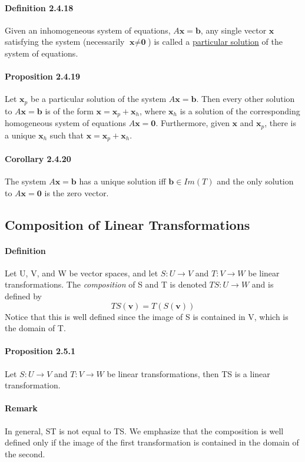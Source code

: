 \documentclass[11pt]{article}
\newcommand{\ti}[1]{\textit{#1}}
\newcommand{\tb}[1]{\textbf{#1}}
\newcommand{\under}[1]{\underline{#1}}
\begin{document}
{\paragraph{Definition 2.4.18} Given an inhomogeneous system of equations, $A\tb{x} = \tb{b}$, any single vector $\tb{x}$ satisfying the system (necessarily $\tb{x} \neq \tb{0}$) is called a \under{particular solution} of the system of equations.
\paragraph{Proposition 2.4.19} Let $\tb{x}_p$ be a particular solution of the system $A\tb{x} = \tb{b}$. Then every other solution to $A\tb{x} = \tb{b}$ is of the form $\tb{x} = \tb{x}_p + \tb{x}_h$, where $\tb{x}_h$ is a solution of the corresponding homogeneous system of equations $A\tb{x} = \tb{0}$. Furthermore, given $\tb{x}$ and $\tb{x}_p$, there is a unique
	$\tb{x}_h$ such that $\tb{x} = \tb{x}_p + \tb{x}_h$.
\paragraph{Corollary 2.4.20} The system $A\tb{x} = \tb{b}$ has a unique solution iff $\tb{b} \in Im(T)$ and the only solution to $A\tb{x} = \tb{0}$ is the zero vector.
\subsection{Composition of Linear Transformations}
\paragraph{Definition} Let U, V, and W be vector spaces, and let $S: U \rightarrow V$ and $T: V \rightarrow W$ be linear transformations. The \ti{composition} of S and T is denoted $TS: U \rightarrow W$ and is defined by $$TS(\tb{v}) = T(S(\tb{v}))$$
Notice that this is well defined since the image of S is contained in V, which is the domain of T.
\paragraph{Proposition 2.5.1} Let $S: U \rightarrow V$ and $T: V \rightarrow W$ be linear transformations, then TS is a linear transformation.
\paragraph{Remark} In general, ST is not equal to TS. We emphasize that the composition is well defined only if the image of the first transformation is contained in the domain of the second.
}
\end{document}
